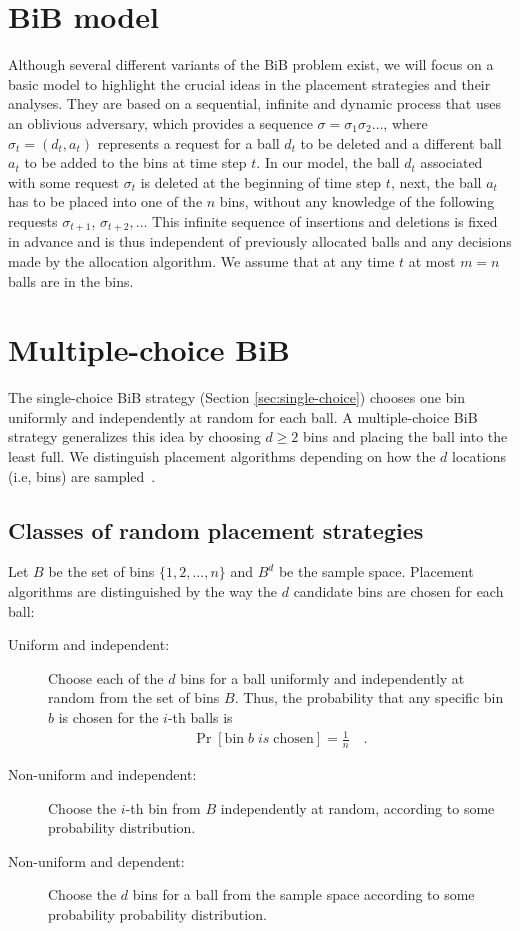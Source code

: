 \documentclass[a4paper,12pt]{article}
\begin{document}
\section{BiB model}
\label{sec:model}
Although several different variants of the BiB problem exist, we will focus on a basic model to highlight the crucial ideas in the placement strategies and their analyses. They are based on a sequential, infinite and dynamic process that uses an oblivious adversary, which provides a sequence $\sigma = \sigma_1 \sigma_2 \dots$, where $\sigma_t = (d_t, a_t)$ represents a request for a ball $d_t$ to be deleted and a different ball $a_t$ to be added to the bins at time step $t$. In our model, the ball $d_t$ associated with some request $\sigma_t$ is deleted at the beginning of time step $t$, next, the ball $a_t$ has to be placed into one of the $n$ bins, without any knowledge of the following requests $\sigma_{t+1}$, $\sigma_{t+2},\dots$ This infinite sequence of insertions and deletions is fixed in advance and is thus independent of previously allocated balls and any decisions made by the allocation algorithm. We assume that at any time $t$ at most $m = n$ balls are in the bins.

\section{Multiple-choice BiB}
\label{sec:multiple-choice}
The single-choice BiB strategy (Section \ref{sec:single-choice}) chooses one bin uniformly and independently at random for each ball. A multiple-choice BiB strategy generalizes this idea by  choosing $d \geq 2$ bins and placing the ball into the least full. We distinguish placement algorithms depending on how the $d$ locations (i.e, bins) are sampled~\cite{VOC03}. 

\subsection{Classes of random placement strategies}
\label{sec:classesOfPlacement}
Let $B$ be the set of bins $\{1,2,...,n\}$ and $B^{d}$ be the sample space. Placement algorithms are distinguished by the way the $d$ candidate bins are chosen for each ball:
\begin{description}
\item [Uniform and independent:] Choose each of the $d$ bins for a ball uniformly and independently at random from the set of bins $B$. Thus, the probability that any specific bin $b$ is chosen for the $i$-th balls is
\begin{align*}
\Pr[\mathrm{bin}\;b\;is\;\mathrm{chosen}] = \frac{1}{n} \quad .
\end{align*}
\item [Non-uniform and independent:] Choose the $i$-th bin from $B$ independently at random, according to some probability distribution.
\item [Non-uniform and dependent:] Choose the $d$ bins for a ball from the sample space according to some probability probability distribution.
\end{description}
 
\end{document}
